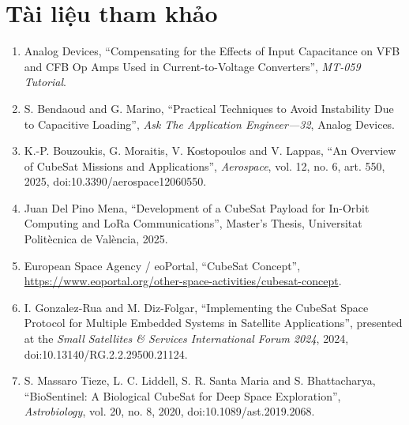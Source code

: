 \chapter{Tài liệu tham khảo}
\label{ch:tai-lieu-tham-khao}
\begingroup
\sloppy
\def\UrlBreaks{\do\/\do-\do\_}
\begin{enumerate}
    \item Analog Devices, ``Compensating for the Effects of Input Capacitance on VFB and CFB Op Amps Used in Current-to-Voltage Converters'', \textit{MT-059 Tutorial}.

    \item S. Bendaoud and G. Marino, ``Practical Techniques to Avoid Instability Due to Capacitive Loading'', \textit{Ask The Application Engineer—32}, Analog Devices.

    \item K.-P. Bouzoukis, G. Moraitis, V. Kostopoulos and V. Lappas, ``An Overview of CubeSat Missions and Applications'', \textit{Aerospace}, vol. 12, no. 6, art. 550, 2025, doi:10.3390/aerospace12060550.

    \item Juan Del Pino Mena, ``Development of a CubeSat Payload for In-Orbit Computing and LoRa Communications'', Master's Thesis, Universitat Polit\`ecnica de Val\`encia, 2025.

    \item European Space Agency / eoPortal, ``CubeSat Concept'', \url{https://www.eoportal.org/other-space-activities/cubesat-concept}.

    \item I. Gonzalez-Rua and M. Diz-Folgar, ``Implementing the CubeSat Space Protocol for Multiple Embedded Systems in Satellite Applications'', presented at the \textit{Small Satellites \& Services International Forum 2024}, 2024, doi:10.13140/RG.2.2.29500.21124.

    \item S. Massaro Tieze, L. C. Liddell, S. R. Santa Maria and S. Bhattacharya, ``BioSentinel: A Biological CubeSat for Deep Space Exploration'', \textit{Astrobiology}, vol. 20, no. 8, 2020, doi:10.1089/ast.2019.2068.
\end{enumerate}
\endgroup
